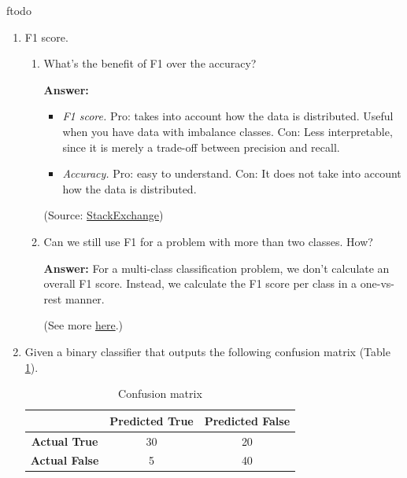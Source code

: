 ƒtodo\documentclass{article}
\newenvironment{QandA}{\begin{enumerate}[label=\arabic*.]}{\end{enumerate}}
\newenvironment{InnerQandA}{\begin{enumerate}[label=\roman*.]}{\end{enumerate}}
\newenvironment{answer}{\par\normalfont \textbf{Answer:}}{}
\begin{document}
\begin{QandA}
    \item F1 score.
    \begin{InnerQandA}
        \item What’s the benefit of F1 over the accuracy?
        \begin{answer}
            \begin{itemize}
                \item \textit{F1 score.} Pro: takes into account how the data is distributed. Useful when you have data with imbalance classes. Con: Less interpretable, since it is merely a trade-off between precision and recall.
                \item \textit{Accuracy.} Pro: easy to understand. Con: It does not take into account how the data is distributed.
            \end{itemize}

            (Source: \href{https://datascience.stackexchange.com/questions/65341/f1-score-vs-accuracy-which-metric-is-more-important}{StackExchange})
        \end{answer}

        \item Can we still use F1 for a problem with more than two classes. How?
        \begin{answer}
            For a multi-class classification problem, we don’t calculate an overall F1 score. Instead, we calculate the F1 score per class in a one-vs-rest manner. 

            (See more \href{https://www.baeldung.com/cs/multi-class-f1-score}{here}.)
        \end{answer}
    \end{InnerQandA}

    \item Given a binary classifier that outputs the following confusion matrix (Table \ref{tab:confusion-matrix}).

    \begin{table}[htb!]
    \centering
\begin{tabular}{|c|c|c|}
\hline
                      & \textbf{Predicted True} & \textbf{Predicted False} \\ \hline
\textbf{Actual True}  & 30                      & 20                       \\ \hline
\textbf{Actual False} & 5                       & 40                       \\ \hline
\end{tabular}
\caption{Confusion matrix}
\label{tab:confusion-matrix}
\end{table}
    

\end{QandA}
\end{document}

